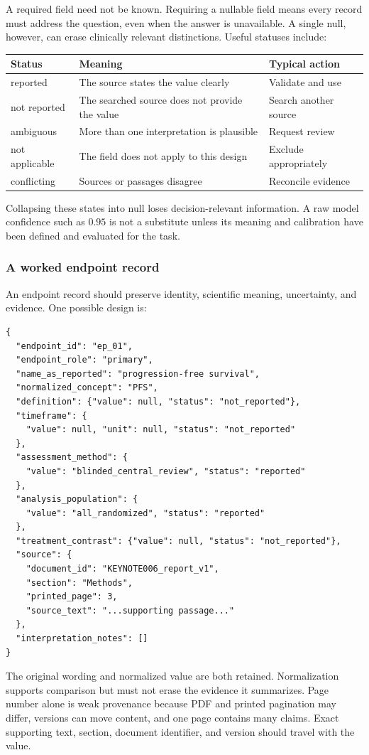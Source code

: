 \documentclass[12pt,oneside]{book}
\numberwithin{equation}{section}
\theoremstyle{definition}
\theoremstyle{plain}
\theoremstyle{remark}
\begin{document}
A required field need not be known.  Requiring a nullable field means every
record must address the question, even when the answer is unavailable.  A
single null, however, can erase clinically relevant distinctions.  Useful
statuses include:
\begin{center}
\begin{tabular}{>{\raggedright\arraybackslash}p{}
                >{\raggedright\arraybackslash}p{}
                >{\raggedright\arraybackslash}p{}}
\toprule
\textbf{Status} & \textbf{Meaning} & \textbf{Typical action}\\
\midrule
reported & The source states the value clearly & Validate and use\\
not reported & The searched source does not provide the value & Search another source\\
ambiguous & More than one interpretation is plausible & Request review\\
not applicable & The field does not apply to this design & Exclude appropriately\\
conflicting & Sources or passages disagree & Reconcile evidence\\
\bottomrule
\end{tabular}
\end{center}
Collapsing these states into null loses decision-relevant information.  A raw
model confidence such as $0.95$ is not a substitute unless its meaning and
calibration have been defined and evaluated for the task.

\subsubsection{A worked endpoint record}

An endpoint record should preserve identity, scientific meaning, uncertainty,
and evidence.  One possible design is:
\begin{lstlisting}[language={},numbers=none]
{
  "endpoint_id": "ep_01",
  "endpoint_role": "primary",
  "name_as_reported": "progression-free survival",
  "normalized_concept": "PFS",
  "definition": {"value": null, "status": "not_reported"},
  "timeframe": {
    "value": null, "unit": null, "status": "not_reported"
  },
  "assessment_method": {
    "value": "blinded_central_review", "status": "reported"
  },
  "analysis_population": {
    "value": "all_randomized", "status": "reported"
  },
  "treatment_contrast": {"value": null, "status": "not_reported"},
  "source": {
    "document_id": "KEYNOTE006_report_v1",
    "section": "Methods",
    "printed_page": 3,
    "source_text": "...supporting passage..."
  },
  "interpretation_notes": []
}
\end{lstlisting}
The original wording and normalized value are both retained.  Normalization
supports comparison but must not erase the evidence it summarizes.  Page number
alone is weak provenance because PDF and printed pagination may differ, versions
can move content, and one page contains many claims.  Exact supporting text,
section, document identifier, and version should travel with the value.
\end{document}
